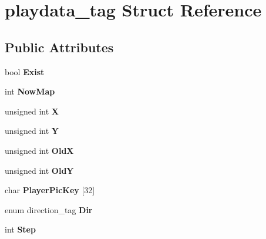 \hypertarget{structplaydata__tag}{}\section{playdata\+\_\+tag Struct Reference}
\label{structplaydata__tag}
\subsection*{Public Attributes}
\begin{DoxyCompactItemize}
\item 
bool {\bfseries Exist}\hypertarget{structplaydata__tag_a5a5fde508ceeaf7a5aa6589b565985c0}{}\label{structplaydata__tag_a5a5fde508ceeaf7a5aa6589b565985c0}

\item 
int {\bfseries Now\+Map}\hypertarget{structplaydata__tag_a5af9cd520612ed3e45810981ca2a5eb7}{}\label{structplaydata__tag_a5af9cd520612ed3e45810981ca2a5eb7}

\item 
unsigned int {\bfseries X}\hypertarget{structplaydata__tag_a3e96df391e27d23b8950916782d7bb0f}{}\label{structplaydata__tag_a3e96df391e27d23b8950916782d7bb0f}

\item 
unsigned int {\bfseries Y}\hypertarget{structplaydata__tag_aaecb1ccdf1d6fd8eabc476882fc8fc23}{}\label{structplaydata__tag_aaecb1ccdf1d6fd8eabc476882fc8fc23}

\item 
unsigned int {\bfseries OldX}\hypertarget{structplaydata__tag_a95c63de23c58a0f979e1348ddc6a3feb}{}\label{structplaydata__tag_a95c63de23c58a0f979e1348ddc6a3feb}

\item 
unsigned int {\bfseries OldY}\hypertarget{structplaydata__tag_afcce849212d7e645100856479276c907}{}\label{structplaydata__tag_afcce849212d7e645100856479276c907}

\item 
char {\bfseries Player\+Pic\+Key} \mbox{[}32\mbox{]}\hypertarget{structplaydata__tag_ae2f7dca12adefcf0736640651221aa4e}{}\label{structplaydata__tag_ae2f7dca12adefcf0736640651221aa4e}

\item 
enum direction\+\_\+tag {\bfseries Dir}\hypertarget{structplaydata__tag_a707b22684060dca47aeda1f4ad465bc6}{}\label{structplaydata__tag_a707b22684060dca47aeda1f4ad465bc6}

\item 
int {\bfseries Step}\hypertarget{structplaydata__tag_a6900f6671dde8a1f14e56753baaee52f}{}\label{structplaydata__tag_a6900f6671dde8a1f14e56753baaee52f}


\end{DoxyCompactItemize}
